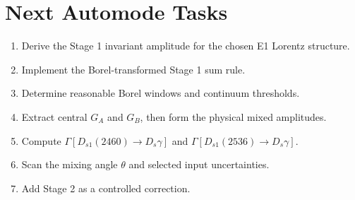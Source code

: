 \documentclass[11pt]{article}
\newcommand{\Ds}{D_s}
\newcommand{\Dsone}{D_{s1}}
\begin{document}
\section{Next Automode Tasks}

\begin{enumerate}
  \item Derive the Stage 1 invariant amplitude for the chosen E1 Lorentz
  structure.
  \item Implement the Borel-transformed Stage 1 sum rule.
  \item Determine reasonable Borel windows and continuum thresholds.
  \item Extract central $G_A$ and $G_B$, then form the physical mixed
  amplitudes.
  \item Compute $\Gamma[\Dsone(2460)\to\Ds\gamma]$ and
  $\Gamma[\Dsone(2536)\to\Ds\gamma]$.
  \item Scan the mixing angle $\theta$ and selected input uncertainties.
  \item Add Stage 2 as a controlled correction.
\end{enumerate}
\end{document}

